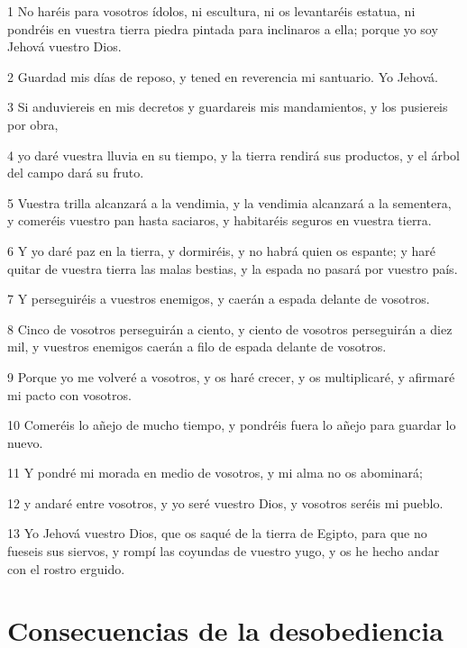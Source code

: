 \par 1 No haréis para vosotros ídolos, ni escultura,  ni os levantaréis estatua, ni pondréis en vuestra tierra piedra pintada para inclinaros a ella; porque yo soy Jehová vuestro Dios.
\par 2 Guardad mis días de reposo, y tened en reverencia mi santuario. Yo Jehová.
\par 3 Si anduviereis en mis decretos y guardareis mis mandamientos, y los pusiereis por obra,
\par 4 yo daré vuestra lluvia en su tiempo, y la tierra rendirá sus productos, y el árbol del campo dará su fruto.
\par 5 Vuestra trilla alcanzará a la vendimia, y la vendimia alcanzará a la sementera, y comeréis vuestro pan hasta saciaros, y habitaréis seguros en vuestra tierra.
\par 6 Y yo daré paz en la tierra, y dormiréis, y no habrá quien os espante; y haré quitar de vuestra tierra las malas bestias, y la espada no pasará por vuestro país.
\par 7 Y perseguiréis a vuestros enemigos, y caerán a espada delante de vosotros.
\par 8 Cinco de vosotros perseguirán a ciento, y ciento de vosotros perseguirán a diez mil, y vuestros enemigos caerán a filo de espada delante de vosotros.
\par 9 Porque yo me volveré a vosotros, y os haré crecer, y os multiplicaré, y afirmaré mi pacto con vosotros.
\par 10 Comeréis lo añejo de mucho tiempo, y pondréis fuera lo añejo para guardar lo nuevo.
\par 11 Y pondré mi morada en medio de vosotros, y mi alma no os abominará;
\par 12 y andaré entre vosotros, y yo seré vuestro Dios, y vosotros seréis mi pueblo.
\par 13 Yo Jehová vuestro Dios, que os saqué de la tierra de Egipto, para que no fueseis sus siervos, y rompí las coyundas de vuestro yugo, y os he hecho andar con el rostro erguido.

\section*{Consecuencias de la desobediencia}

